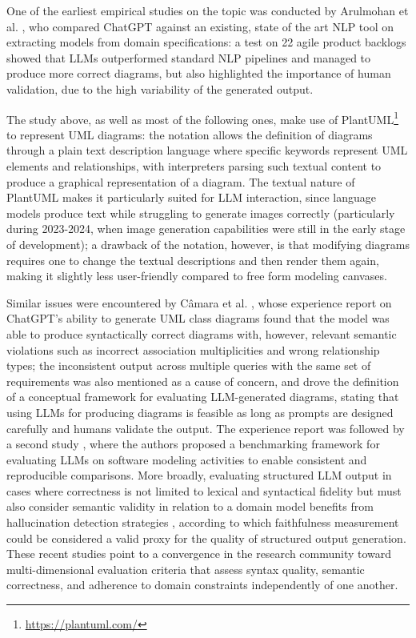 {{One of the earliest empirical studies on the topic was conducted by Arulmohan et al. \cite{arulmohan2023extracting}, who compared ChatGPT against an existing, state of the art NLP tool on extracting models from domain specifications: a test on 22 agile product backlogs showed that LLMs outperformed standard NLP pipelines and managed to produce more correct diagrams, but also highlighted the importance of human validation, due to the high variability of the generated output. 

The study above, as well as most of the following ones, make use of PlantUML\footnote{\url{https://plantuml.com/}} to represent UML diagrams: the notation allows the definition of diagrams through a plain text description language where specific keywords represent UML elements and relationships, with interpreters parsing such textual content to produce a graphical representation of a diagram. The textual nature of PlantUML makes it particularly suited for LLM interaction, since language models produce text while struggling to generate images correctly (particularly during 2023-2024, when image generation capabilities were still in the early stage of development); a drawback of the notation, however, is that modifying diagrams requires one to change the textual descriptions and then render them again, making it slightly less user-friendly compared to free form modeling canvases.

Similar issues were encountered by Câmara et al. \cite{camara2023assessment}, whose experience report on ChatGPT's ability to generate UML class diagrams found that the model was able to produce syntactically correct diagrams with, however, relevant semantic violations such as incorrect association multiplicities and wrong relationship types; the inconsistent output across multiple queries with the same set of requirements was also mentioned as a cause of concern, and drove the definition of a conceptual framework for evaluating LLM-generated diagrams, stating that using LLMs for producing diagrams is feasible as long as prompts are designed carefully and humans validate the output. The experience report was followed by a second study \cite{camara2024benchmarks}, where the authors proposed a benchmarking framework for evaluating LLMs on software modeling activities to enable consistent and reproducible comparisons. More broadly, evaluating structured LLM output in cases where correctness is not limited to lexical and syntactical fidelity but must also consider semantic validity in relation to a domain model benefits from hallucination detection strategies \cite{huang2025hallucination}, according to which faithfulness measurement could be considered a valid proxy for the quality of structured output generation. These recent studies point to a convergence in the research community toward multi-dimensional evaluation criteria that assess syntax quality, semantic correctness, and adherence to domain constraints independently of one another.

}}
